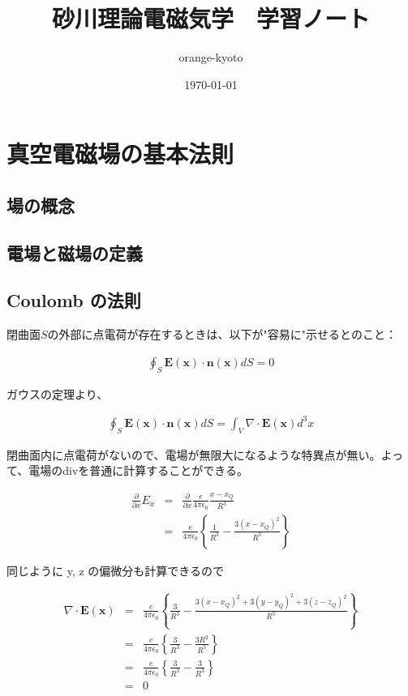 \documentclass[a4j,12pt,uplatex,dvipdfmx]{jsreport}
\title{砂川理論電磁気学　学習ノート}
\author{orange-kyoto}
\date{\today}
\begin{document}
\maketitle

\tableofcontents
\clearpage

\chapter{真空電磁場の基本法則}

\section{場の概念}

\section{電場と磁場の定義}

\section{Coulomb の法則}

閉曲面$S$の外部に点電荷が存在するときは、以下が"容易に"示せるとのこと：

\begin{eqnarray*}
  \oint_{S} \bm{E}(\bm{x}) \cdot \bm{n}(\bm{x}) dS = 0
\end{eqnarray*}

ガウスの定理より、

\begin{eqnarray*}
  \oint_{S} \bm{E}(\bm{x}) \cdot \bm{n}(\bm{x}) dS = \int_{V} \nabla \cdot \bm{E}(\bm{x}) d^3 x
\end{eqnarray*}

閉曲面内に点電荷がないので、電場が無限大になるような特異点が無い。よって、電場のdivを普通に計算することができる。

\begin{eqnarray*}
  \frac{\partial}{\partial x} E_{x}
  &=& \frac{\partial}{\partial x} \frac{e}{4 \pi \epsilon_0} \frac{x - x_{Q}}{R^3} \\
  &=& \frac{e}{4 \pi \epsilon_0} \left\{ \frac{1}{R^3} - \frac{3 ( x - x_{Q} )^2}{R^5} \right\}
\end{eqnarray*}

同じように y, z の偏微分も計算できるので

\begin{eqnarray*}
  \nabla \cdot \bm{E}(\bm{x}) &=& \frac{e}{4 \pi \epsilon_0} \left\{ \frac{3}{R^3} - \frac{3 ( x - x_{Q} )^2 + 3 ( y - y_{Q} )^2 + 3 ( z - z_{Q} )^2}{R^5} \right\} \\
  &=& \frac{e}{4 \pi \epsilon_0} \left\{ \frac{3}{R^3} - \frac{3 R^2}{R^5} \right\} \\
  &=& \frac{e}{4 \pi \epsilon_0} \left\{ \frac{3}{R^3} - \frac{3}{R^3} \right\} \\
  &=& 0
\end{eqnarray*}
\end{document}
